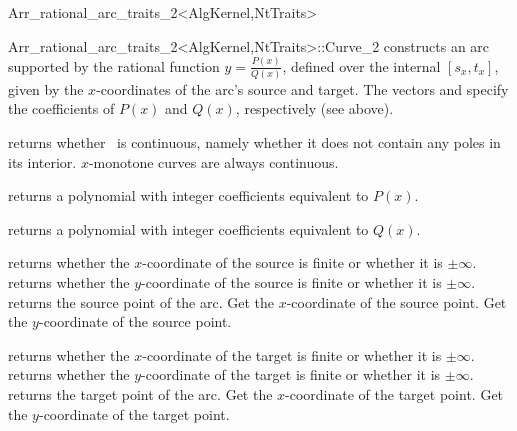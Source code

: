 \begin{ccRefClass}{Arr_rational_arc_traits_2<AlgKernel,NtTraits>}
\begin{ccClass}{Arr_rational_arc_traits_2<AlgKernel,NtTraits>::Curve_2}
  {constructs an arc supported by the rational function
   $y = \frac{P(x)}{Q(x)}$, defined over the internal $[s_x, t_x]$,
   given by the $x$-coordinates of the arc's source and target.
   The vectors  and  specify the coefficients
   of $P(x)$ and $Q(x)$, respectively (see above).
   }

\ccAccessFunctions

  {returns whether \ccVar\ is continuous, namely whether it does not
   contain any poles in its interior. $x$-monotone curves are always
   continuous.}

  {returns a polynomial with integer coefficients equivalent to $P(x)$.}

  {returns a polynomial with integer coefficients equivalent to $Q(x)$.}

  {returns whether the $x$-coordinate of the source is finite or
   whether it is $\pm\infty$.}
\ccGlue
{}
  {returns whether the $y$-coordinate of the source is finite or
   whether it is $\pm\infty$.}
\ccGlue
{}
  {returns the source point of the arc.
   }
\ccGlue
{}
  {Get the $x$-coordinate of the source point.
   }
\ccGlue
{}
  {Get the $y$-coordinate of the source point.
   }

  {returns whether the $x$-coordinate of the target is finite or
   whether it is $\pm\infty$.}
\ccGlue
{}
  {returns whether the $y$-coordinate of the target is finite or
   whether it is $\pm\infty$.}
\ccGlue
{}
  {returns the target point of the arc.
   }
\ccGlue
{}
  {Get the $x$-coordinate of the target point.
   }
\ccGlue
{}
  {Get the $y$-coordinate of the target point.
   }


\end{ccClass}
\end{ccRefClass}

